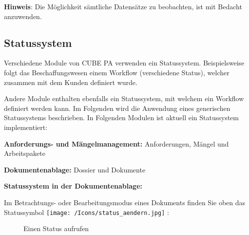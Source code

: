\vspace{\baselineskip}

\textbf{Hinweis}: Die Möglichkeit sämtliche Datensätze zu beobachten, ist mit Bedacht anzuwenden.

\pagebreak
\subsection{Statussystem} %
\label{bkm:Ref2018073101}

Verschiedene Module von CUBE PA verwenden ein Statussystem. Beispielsweise folgt das Beschaffungswesen einem Workflow (verschiedene Status), welcher zusammen mit dem Kunden definiert wurde.

Andere Module enthalten ebenfalls ein Statussystem, mit welchem ein Workflow definiert werden kann. Im Folgenden wird die Anwendung eines generischen Statussystems beschrieben. In Folgenden Modulen ist aktuell ein Statussystem implementiert:

\vspace{\baselineskip}

\begin{compactitem}
	\item \textbf{Anforderungs- und Mängelmanagement:} Anforderungen, Mängel und Arbeitspakete
	\item \textbf{Dokumentenablage:} Dossier und Dokumente
\end{compactitem}

\vspace{\baselineskip}

\textbf{Statussystem in der Dokumentenablage:}

\vspace{\baselineskip}

Im Betrachtungs- oder Bearbeitungsmodus eines Dokuments finden Sie oben das Statussymbol \texttt{[image: /Icons/status\_aendern.jpg]} : 

\begin{figure}[H]
\caption{Einen Status aufrufen}
\end{figure}

